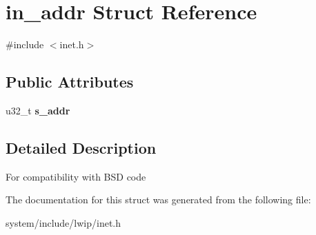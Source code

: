 \hypertarget{structin__addr}{}\section{in\+\_\+addr Struct Reference}
\label{structin__addr}


{\ttfamily \#include $<$inet.\+h$>$}

\subsection*{Public Attributes}
\begin{DoxyCompactItemize}
\item 
\hypertarget{structin__addr_a0c76d44232bae90455a5189b32a9b625}{}u32\+\_\+t {\bfseries s\+\_\+addr}\label{structin__addr_a0c76d44232bae90455a5189b32a9b625}

\end{DoxyCompactItemize}


\subsection{Detailed Description}
For compatibility with B\+S\+D code 

The documentation for this struct was generated from the following file\+:\begin{DoxyCompactItemize}
\item 
system/include/lwip/inet.\+h\end{DoxyCompactItemize}
